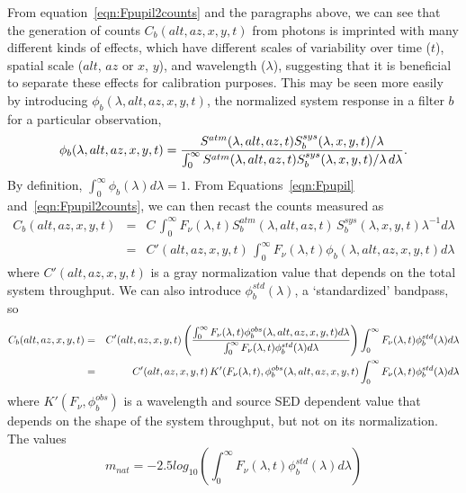 \documentclass[12pt,preprint]{aastex}
\begin{document}
From equation~\ref{eqn:Fpupil2counts} and the paragraphs above, we can
see that the generation of counts $C_b(alt,az,x,y,t)$ from photons is
imprinted with many different kinds of effects, which have different
scales of variability over time ($t$), spatial scale ($alt$, $az$ or
$x$, $y$), and wavelength ($\lambda$), suggesting that it is
beneficial to separate these effects for calibration
purposes. This may be
seen more easily by introducing $\phi_b(\lambda,alt,az,x,y,t)$, the normalized system
response in a filter $b$ for a particular observation,
\begin{equation}
\label{eqn:PhiDef}
   \phi_b(\lambda,alt,az,x,y,t) = {
     {S^{atm}(\lambda,alt,az,t) S_b^{sys}(\lambda,x,y,t) \slash
       \lambda} \over
     \int_0^\infty { {S^{atm}(\lambda,alt,az,t) 
         S_b^{sys}(\lambda,x,y,t) \slash \lambda} \,d\lambda}}.
\end{equation}
By definition, $\int_0^\infty {\phi_b(\lambda) d\lambda}=1$.  From
Equations~\ref{eqn:Fpupil} and~\ref{eqn:Fpupil2counts}, we can then
recast the counts measured as
\begin{eqnarray}
\label{eqn:fullcounts}
C_b(alt,az,x,y,t) & = & C \, \int_0^\infty {F_\nu(\lambda,t)
  S_b^{atm}(\lambda,alt,az,t) \, S_b^{sys}(\lambda,x,y,t)
  \lambda^{-1}d\lambda} \\
&= & C'(alt,az,x,y,t) \,
     \int_0^\infty {F_\nu(\lambda,t)\phi_b(\lambda,alt,az,x,y,t)
       d\lambda} 
\end{eqnarray}
where $C'(alt,az,x,y,t)$ is a gray normalization value that depends
on the total system throughput. We can also introduce
$\phi_b^{std}(\lambda)$, a `standardized' bandpass, so
\begin{eqnarray}
C_b(alt,az,x,y,t) & = & C'(alt,az,x,y,t)
\left( {\int_0^\infty {F_\nu(\lambda,t)\phi_b^{obs}(\lambda,alt,az,x,y,t) d\lambda} \over 
\int_0^\infty {F_\nu(\lambda,t)\phi_b^{std}(\lambda) d\lambda}} 
\right) \int_0^\infty {F_\nu(\lambda,t)\phi_b^{std}(\lambda)  d\lambda}
\nonumber \\ 
& = & C'(alt,az,x,y,t) \, K'(F_\nu(\lambda,t),
\phi_b^{obs}(\lambda,alt,az,x,y,t) 
\int_0^\infty {F_\nu(\lambda,t)\phi_b^{std}(\lambda)  d\lambda} 
\end{eqnarray}
where $K'(F_\nu, \phi_b^{obs})$ is a wavelength and source SED
dependent value that depends on the shape of the system throughput,
but not on its normalization. The values 
\begin{equation}
\label{eqn:defnatmags}
 m_{nat} =  -2.5 log_{10} (\int_0^\infty {F_\nu(\lambda,t)\phi_b^{std}(\lambda)  d\lambda})
\end{equation}
\end{document}
